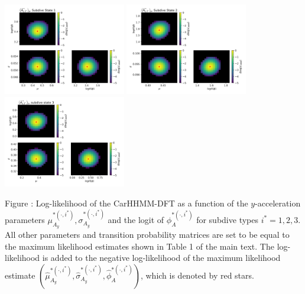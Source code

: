 \documentclass{article}
\begin{document}
        
        \begin{center}
        \includegraphics[width=2.1in]{../Plots/2019/20190902-182840-CATs_OB_1_0_267_CarHHMM2_fine-theta-likelihood-Ay-0.png}
        \includegraphics[width=2.1in]{../Plots/2019/20190902-182840-CATs_OB_1_0_267_CarHHMM2_fine-theta-likelihood-Ay-1.png}
        \includegraphics[width=2.1in]{../Plots/2019/20190902-182840-CATs_OB_1_0_267_CarHHMM2_fine-theta-likelihood-Ay-2.png}
        \end{center}
        
        \noindent Figure : Log-likelihood of the CarHHMM-DFT as a function of the $y$-acceleration parameters $\mu_{A_y}^{*(\cdot,i^*)}, \sigma_{A_y}^{*(\cdot,i^*)}$ and the logit of $\phi_{A}^{*(\cdot,i^*)}$ for subdive types $i^* = 1,2,3$. All other parameters and transition probability matrices are set to be equal to the maximum likelihood estimates shown in Table 1 of the main text. The log-likelihood is added to the negative log-likelihood of the maximum likelihood estimate $(\hat \mu_{A_y}^{*(\cdot,i^*)}, \hat \sigma_{A_y}^{*(\cdot,i^*)}, \hat \phi_{A}^{*(\cdot,i^*)})$, which is denoted by red stars.
        \addtocounter{fignum}{1}
        
\end{document}
